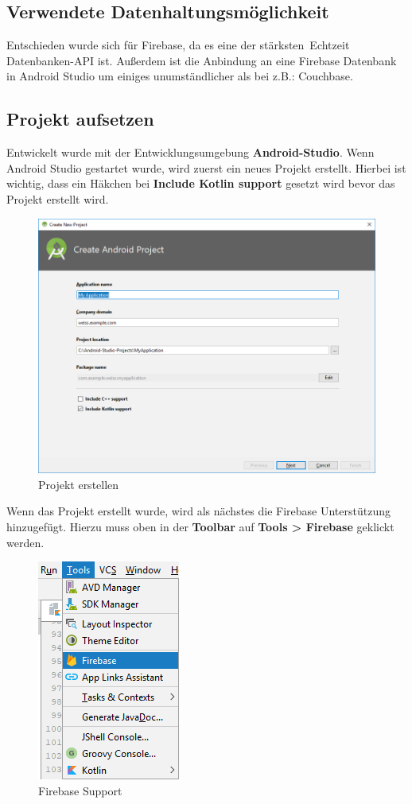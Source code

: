 \subsection{Verwendete Datenhaltungsmöglichkeit}
Entschieden wurde sich für Firebase, da es eine der \glqq stärksten\grqq \ Echtzeit Datenbanken-API ist. Außerdem ist die Anbindung an eine Firebase Datenbank in Android Studio um einiges unumständlicher als bei z.B.: Couchbase.

\clearpage

\subsection{Projekt aufsetzen}
Entwickelt wurde mit der Entwicklungsumgebung \textbf{Android-Studio}. Wenn Android Studio gestartet wurde, wird zuerst ein neues Projekt erstellt. Hierbei ist wichtig, dass ein Häkchen bei \textbf{Include Kotlin support} gesetzt wird bevor das Projekt erstellt wird.

\begin{figure}[!h]
	\begin{center}
		\includegraphics[width=0.6\linewidth]{images/proj-erst.png}
		\caption{Projekt erstellen}
	\end{center}
\end{figure}

Wenn das Projekt erstellt wurde, wird als nächstes die Firebase Unterstützung hinzugefügt. Hierzu muss oben in der \textbf{Toolbar} auf \textbf{Tools > Firebase} geklickt werden.

\begin{figure}[!h]
	\begin{center}
		\includegraphics[width=0.2\linewidth]{images/firebase-supp.png}
		\caption{Firebase Support}
	\end{center}
\end{figure}

